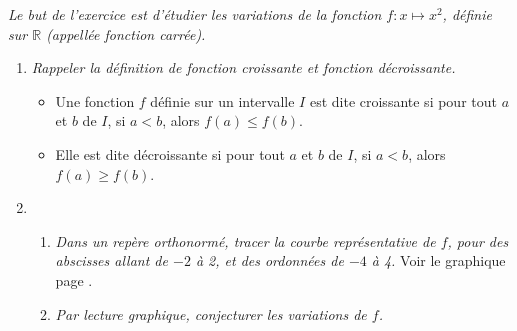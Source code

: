 \documentclass[11pt]{article}
\begin{document}
\begin{exercice}\label{exo:carree}
  \emph{Le but de l'exercice est d'étudier les variations de la fonction $f:x\mapsto x^2$, définie sur $\mathbb{R}$ (appellée \emph{fonction carrée}).}

  \begin{enumerate}
    \item \emph{Rappeler la définition de \emph{fonction croissante} et \emph{fonction décroissante}.}
      \label{question:definitions}
      \begin{itemize}
        \item Une fonction $f$ définie sur un intervalle $I$ est dite croissante si pour tout $a$ et $b$ de $I$, si $a<b$, alors $f(a)\leq f(b)$.
        \item Elle est dite décroissante si pour tout $a$ et $b$ de $I$, si $a<b$, alors $f(a)\geq f(b)$.
      \end{itemize}
    \item 
      \begin{enumerate}
        \item \emph{Dans un repère orthonormé, tracer la courbe représentative de $f$, pour des abscisses allant de $-2$ à 2, et des ordonnées de $-4$ à 4.}
          Voir le graphique page \pageref{figure:courbes}.
        \item \emph{Par lecture graphique, conjecturer les variations de $f$.}


\end{enumerate}
\end{enumerate}
\end{exercice}
\end{document}
